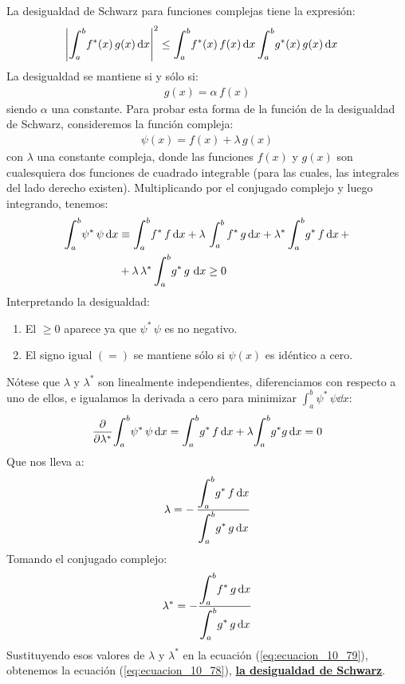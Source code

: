 \documentclass[12pt]{article}
\def\scaleint#1{\vcenter{\hbox{\scaleto[3ex]{\displaystyle\int}{#1}}}}
\def\bs{\mkern-12mu}
\numberwithin{equation}{section}
\begin{document}
La desigualdad de Schwarz para funciones complejas tiene la expresión:
\begin{align}
&\abs{ \scaleint{6ex}_{\bs a}^{b} f^{*} (x) \, g (x) \dd{x} }^{2} \leq \scaleint{6ex}_{\bs a}^{b} f^{*} (x) \, f (x) \dd{x} \scaleint{6ex}_{\bs a}^{b} g^{*} (x) \, g (x) \dd{x}
\label{eq:ecuacion_10_78}
\end{align}
La desigualdad se mantiene si y sólo si:
\begin{align*}
g (x) = \alpha \, f (x)
\end{align*}
siendo $\alpha$ una constante. Para probar esta forma de la función de la desigualdad de Schwarz, consideremos la función compleja:
\begin{align*}
\psi (x) = f(x) + \lambda \, g (x)
\end{align*}
con $\lambda$ una constante compleja, donde las funciones $f (x)$ y $g (x)$ son cualesquiera dos funciones de cuadrado integrable (para las cuales, las integrales del lado derecho existen). Multiplicando por el conjugado complejo y luego integrando, tenemos:
\begin{align}
\begin{aligned}
\scaleint{6ex}_{\bs a}^{b} \psi^{*} \, \psi \dd{x} &\equiv \scaleint{6ex}_{\bs a}^{b} f^{*} \, f \dd{x} + \lambda \, \int_{a}^{b} f^{*} \, g \dd{x} + \lambda^{*} \, \scaleint{6ex}_{\bs a}^{b} g^{*} \, f \dd{x} + \\
&+ \lambda \, \lambda^{*} \, \scaleint{6ex}_{\bs a}^{b} g^{*} \, g \, \dd{x}  \geq 0
\end{aligned}
\label{eq:ecuacion_10_79}
\end{align}
Interpretando la desigualdad:
\begin{enumerate}
\item El $\geq 0$ aparece ya que $\psi^{*} \, \psi$ es no negativo.
\item El signo igual $(=)$ se mantiene sólo si $\psi (x)$ es idéntico a cero.
\end{enumerate}
Nótese que $\lambda$ y $\lambda^{*}$ son linealmente independientes,  diferenciamos con respecto a uno de ellos,  e igualamos la derivada a cero para minimizar $\displaystyle \int_{a}^{b} \psi^{*} \, \psi \dd{x}$:
\begin{align*}
\pdv{\lambda^{*}} \scaleint{6ex}_{\bs a}^{b} \psi^{*} \, \psi \dd{x} = \scaleint{6ex}_{\bs a}^{b} g^{*} \, f \dd{x}  + \lambda \scaleint{6ex}_{\bs a}^{b} g^{*} g \dd{x} = 0
\end{align*}
Que nos lleva a:
\begin{align}
\lambda = - \, \dfrac{\displaystyle \scaleint{6ex}_{\bs a}^{b} g^{*} \, f \dd{x}}{\displaystyle \scaleint{6ex}_{\bs a}^{b} g^{*} \, g \dd{x}}
\label{eq:ecuacion_10_80a}
\end{align}
Tomando el conjugado complejo:
\begin{align}
\lambda^{*} = - \dfrac{\displaystyle \scaleint{6ex}_{\bs a}^{b} f^{*} \, g \dd{x}}{\displaystyle \scaleint{6ex}_{\bs a}^{b} g^{*} \, g \dd{x}}
\label{eq:ecuacion_80b}
\end{align}
Sustituyendo esos valores de $\lambda$ y $\lambda^{*}$ en la ecuación (\ref{eq:ecuacion_10_79}),  obtenemos la ecuación (\ref{eq:ecuacion_10_78}), \underline{\textbf{la desigualdad de Schwarz}}.
\end{document}
